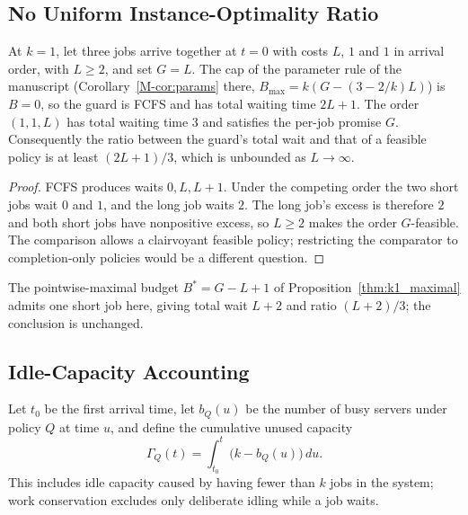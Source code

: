 \subsection{No Uniform Instance-Optimality Ratio}

\begin{proposition}
\label{prop:supp_unbounded_instance}
At $k=1$, let three jobs arrive together at $t=0$ with costs $L$, $1$ and $1$ in
arrival order, with $L\geq2$, and set $G=L$. The cap of the parameter rule of the manuscript
(Corollary~\ref*{M-cor:params} there, $B_{\max} = k(G-(3-2/k)L)$) is $B=0$, so the
guard is FCFS and has total waiting time $2L+1$. The order $(1,1,L)$ has total
waiting time $3$ and satisfies the per-job promise $G$. Consequently the ratio
between the guard's total wait and that of a feasible policy is at least
$(2L+1)/3$, which is unbounded as $L\to\infty$.
\end{proposition}

\begin{proof}
FCFS produces waits $0,L,L+1$. Under the competing order the two short jobs wait
$0$ and $1$, and the long job waits $2$. The long job's excess is therefore $2$
and both short jobs have nonpositive excess, so $L\geq2$ makes the order
$G$-feasible. The comparison allows a clairvoyant feasible policy; restricting
the comparator to completion-only policies would be a different question.
\end{proof}

The pointwise-maximal budget $B^{*}=G-L+1$ of Proposition~\ref{thm:k1_maximal}
admits one short job here, giving total wait $L+2$ and ratio $(L+2)/3$; the
conclusion is unchanged.

\subsection{Idle-Capacity Accounting}

Let $t_0$ be the first arrival time, let $b_Q(u)$ be the number of busy servers
under policy $Q$ at time $u$, and define the cumulative unused capacity
\[
 \Gamma_Q(t)=\int_{t_0}^{t}\bigl(k-b_Q(u)\bigr)\,du.
\]
This includes idle capacity caused by having fewer than $k$ jobs in the system;
work conservation excludes only deliberate idling while a job waits.


